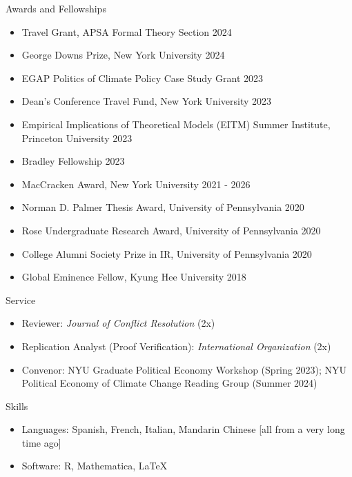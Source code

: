 \documentclass{resume} %
\begin{document}
\begin{rSection}{Awards and Fellowships}
\begin{itemize}
\item Travel Grant, APSA Formal Theory Section \hfill 2024
\item George Downs Prize, New York University \hfill 2024
\item EGAP Politics of Climate Policy Case Study Grant \hfill 2023
\item Dean's Conference Travel Fund, New York University \hfill 2023
\item Empirical Implications of Theoretical Models (EITM) Summer Institute, Princeton University \hfill 2023
\item Bradley Fellowship \hfill 2023
\item MacCracken Award, New York University \hfill 2021 - 2026
\item Norman D. Palmer Thesis Award, University of Pennsylvania \hfill 2020
\item Rose Undergraduate Research Award, University of Pennsylvania \hfill 2020
\item College Alumni Society Prize in IR, University of Pennsylvania \hfill 2020
\item Global Eminence Fellow, Kyung Hee University \hfill 2018
\end{itemize}
\end{rSection}

\begin{rSection}{Service}
\begin{itemize}
\item Reviewer:  \textit{Journal of Conflict Resolution} (2x)
\item Replication Analyst (Proof Verification):  \textit{International Organization} (2x)
\item Convenor: NYU Graduate Political Economy Workshop (Spring 2023); NYU Political Economy of Climate Change Reading Group (Summer 2024)
\end{itemize}
 \end{rSection}

\begin{rSection}{Skills}
\begin{itemize}
\item Languages: Spanish, French, Italian, Mandarin Chinese [all from a very long time ago]
\item Software: R, Mathematica, \LaTeX
\end{itemize}
\end{rSection}
\end{document}
